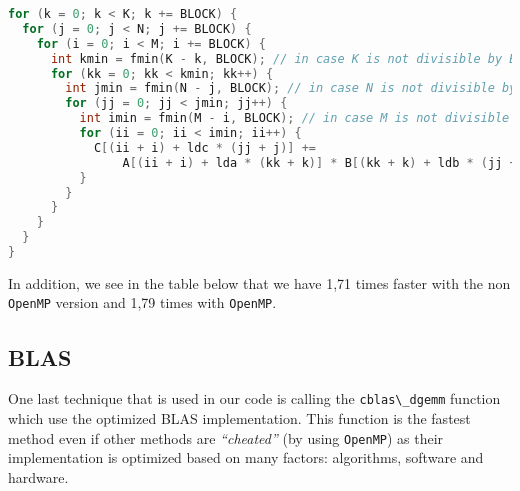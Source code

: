 \documentclass[
  12pt,
  xcolor = usenames,dvipsnames]{article}
\newcommand{\passthrough}[1]{#1}
\begin{document}
\begin{lstlisting}[language=C]
for (k = 0; k < K; k += BLOCK) {
  for (j = 0; j < N; j += BLOCK) {
    for (i = 0; i < M; i += BLOCK) {
      int kmin = fmin(K - k, BLOCK); // in case K is not divisible by BLOCK
      for (kk = 0; kk < kmin; kk++) {
        int jmin = fmin(N - j, BLOCK); // in case N is not divisible by BLOCK
        for (jj = 0; jj < jmin; jj++) {
          int imin = fmin(M - i, BLOCK); // in case M is not divisible by BLOCK
          for (ii = 0; ii < imin; ii++) {
            C[(ii + i) + ldc * (jj + j)] +=
                A[(ii + i) + lda * (kk + k)] * B[(kk + k) + ldb * (jj + j)];
          }
        }
      }
    }
  }
}
\end{lstlisting}

In addition, we see in the table below that we have 1,71 times faster with the non \passthrough{\lstinline!OpenMP!} version and 1,79 times with \passthrough{\lstinline!OpenMP!}.

\begin{table}[!h]
\centering
{}
\end{table}

\hypertarget{blas}{%
\subsection{BLAS}\label{blas}}

One last technique that is used in our code is calling the \passthrough{\lstinline!cblas\_dgemm!} function which use the optimized BLAS implementation. This function is the fastest method even if other methods are \emph{``cheated''} (by using \passthrough{\lstinline!OpenMP!}) as their implementation is optimized based on many factors: algorithms, software and hardware.
\end{document}
